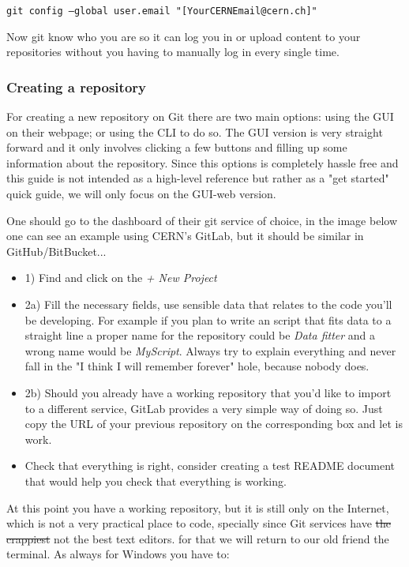 \documentclass[runningheads,a4paper]{llncs}
\begin{document}
        \indent  \texttt{git config --global user.email "[YourCERNEmail@cern.ch]"}\newline

Now git know who you are so it can log you in or upload content to your repositories without you having to manually log in every single time.

\subsubsection{Creating a repository}

For creating a new repository on Git there are two main options: using the GUI on their webpage; or using the CLI to do so. The GUI version is very straight forward and it only involves clicking a few buttons and filling up some information about the repository. Since this options is completely hassle free and this guide is not intended as a high-level reference but rather as a "get started" quick guide, we will only focus on the GUI-web version.

One should go to the dashboard of their git service of choice, in the image below one can see an example using CERN's GitLab, but it should be similar in GitHub/BitBucket... 
\begin{itemize}
    \item{1) Find and click on the \textit{+ New Project}}
    \item{2a) Fill the necessary fields, use sensible data that relates to the code you'll be developing.
    For example if you plan to write an script that fits data to a straight line a proper name for the repository could be \textit{Data fitter} and a wrong name would be \textit{MyScript}. \newline
    Always try to explain everything and never fall in the "I think I will remember forever" hole, because nobody does. }
    \item{2b) Should you already have a working repository that you'd like to import to a different service, GitLab provides a very simple way of doing so. Just copy the URL of your previous repository on the corresponding box and let is work.}
    \item{Check that everything is right, consider creating a test README document that would help you check that everything is working.}
\end{itemize}

At this point you have a working repository, but it is still only on the Internet, which is not a very practical place to code, specially since Git services have \st{ the crappiest} not the best text editors. for that we will return to our old friend the terminal. As always for Windows you have to:
\end{document}
